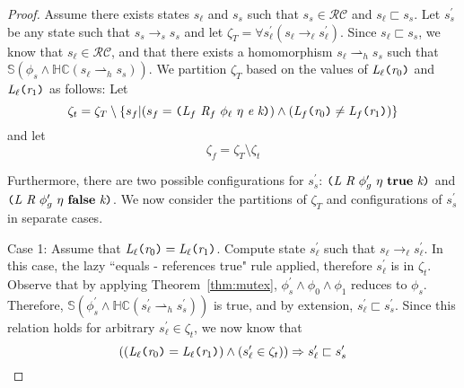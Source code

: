 \begin{proof}
Assume there exists states $s_\ell$ and $s_s$ such that $s_s \in \mathcal{RC}$ and $s_\ell \sqsubset s_s$. Let $s_s^\prime$ be any state such that $s_s \rightarrow_s s_s$ and let $\zeta_T = \forall s_\ell^\prime ( s_\ell \rightarrow_\ell s_\ell^\prime )$. Since $s_\ell \sqsubset s_s$, we know that $s_\ell \in \mathcal{RC}$, and that there exists a homomorphism $s_\ell \rightharpoonup_{h} s_s$ such that $\mathbb{S}( \phi_s \wedge \mathbb{HC}(s_\ell \rightharpoonup_{h} s_s) ) $. We partition $\zeta_T$ based on the values of $\emph{L}_\ell \texttt{(} \emph{r}_0\texttt{)}$ and $\emph{L}_\ell \texttt{(} \emph{r}_1 \texttt{)}$ as follows: Let
$$\zeta_t = \zeta_T \setminus \{ s_f | (s_f= \texttt{(} \emph{L}_f\ \emph{R}_f\ \phi_\ell\ \eta\ \emph{e}\ \emph{k}\texttt{)}) \wedge (\emph{L}_f \texttt{(} \emph{r}_0\texttt{)} \neq \emph{L}_f \texttt{(} \emph{r}_1 \texttt{)} ) \}$$
and let
$$\zeta_f = \zeta_T \setminus \zeta_t$$ 

Furthermore, there are two possible configurations for $s_s^\prime$: $\lp \cfgnt{L}\ \cfgnt{R}\ \phi_g^\prime\ \eta\ \cfgt{true}\ \cfgnt{k}\rp $ and $\lp \cfgnt{L}\ \cfgnt{R}\ \phi_g^\prime\ \eta\ \cfgt{false}\ \cfgnt{k}\rp $. We now consider the partitions of $\zeta_T$ and configurations of $s_s^\prime$ in separate cases.

Case 1: Assume that $\emph{L}_\ell \texttt{(} \emph{r}_0\texttt{)} = \emph{L}_\ell \texttt{(} \emph{r}_1 \texttt{)}$. 
Compute state $s_\ell^\prime$ such that $s_\ell \rightarrow_\ell s_\ell^\prime$. In this case, the lazy ``equals - references true" rule applied, therefore $s_\ell^\prime$ is in $\zeta_t$. Observe that by applying Theorem~\ref{thm:mutex}, $\phi_s^\prime \wedge \phi_0 \wedge \phi_1$ reduces to $\phi_s$. Therefore, $\mathbb{S}( \phi_s^\prime \wedge \mathbb{HC}(s_\ell^\prime \rightharpoonup_{h} s_s^\prime) ) $ is true, and by extension, $s_\ell^\prime \sqsubset s_s^\prime$. Since this relation holds for arbitrary $s_\ell^\prime \in \zeta_t$, we now know that 
\begin{equation}
\label{eqn:RCForwardsTrue}
((\emph{L}_\ell \texttt{(} \emph{r}_0\texttt{)} = \emph{L}_\ell \texttt{(} \emph{r}_1 \texttt{)}) \wedge (s_\ell^\prime \in \zeta_t)) \Rightarrow s_\ell^\prime \sqsubset s_s^\prime
\end{equation}


\end{proof}
